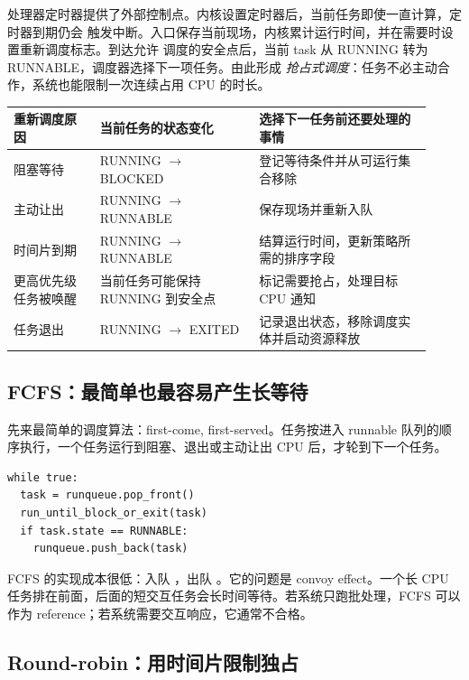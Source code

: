 处理器定时器提供了外部控制点。内核设置定时器后，当前任务即使一直计算，定时器到期仍会
触发中断。入口保存当前现场，内核累计运行时间，并在需要时设置重新调度标志。到达允许
调度的安全点后，当前 task 从 RUNNING 转为 RUNNABLE，调度器选择下一项任务。由此形成
\emph{抢占式调度}：任务不必主动合作，系统也能限制一次连续占用 CPU 的时长。

\begin{longtable}{|L{0.19\linewidth}|L{0.35\linewidth}|L{0.38\linewidth}|}
\toprule
重新调度原因 & 当前任务的状态变化 & 选择下一任务前还要处理的事情 \\
\midrule
阻塞等待 & RUNNING $\rightarrow$ BLOCKED & 登记等待条件并从可运行集合移除 \\\tablerowrule
主动让出 & RUNNING $\rightarrow$ RUNNABLE & 保存现场并重新入队 \\\tablerowrule
时间片到期 & RUNNING $\rightarrow$ RUNNABLE & 结算运行时间，更新策略所需的排序字段 \\\tablerowrule
更高优先级任务被唤醒 & 当前任务可能保持 RUNNING 到安全点 & 标记需要抢占，处理目标 CPU 通知 \\\tablerowrule
任务退出 & RUNNING $\rightarrow$ EXITED & 记录退出状态，移除调度实体并启动资源释放 \\
\bottomrule
\end{longtable}

\subsection{FCFS：最简单也最容易产生长等待}

先来最简单的调度算法：first-come, first-served。任务按进入 runnable 队列的顺序执行，一个任务运行到阻塞、退出或主动让出 CPU 后，才轮到下一个任务。

\begin{lstlisting}
while true:
  task = runqueue.pop_front()
  run_until_block_or_exit(task)
  if task.state == RUNNABLE:
    runqueue.push_back(task)
\end{lstlisting}

FCFS 的实现成本很低：入队 ，出队 。它的问题是 convoy effect。一个长 CPU 任务排在前面，后面的短交互任务会长时间等待。若系统只跑批处理，FCFS 可以作为 reference；若系统需要交互响应，它通常不合格。

\subsection{Round-robin：用时间片限制独占}

